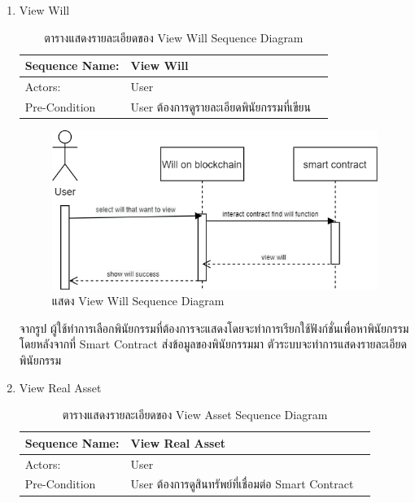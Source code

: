 \documentclass[12pt,oneside,openright,a4paper]{cpe-thai-project}
\begin{document}
\begin{enumerate}[label=\thesubsection.\arabic*,leftmargin=0pt,itemindent=1.25cm]
\clearpage
	\item View Will
	\begin{table}[h]
	\centering
	\caption{ตารางแสดงรายละเอียดของ View Will Sequence Diagram}
\begin{tabularx}{\textwidth}{|l|X|X|} 
		\hline
		Sequence Name: & View Will                                  \\ 
		\hline
		Actors:        & User                                       \\ 
		\hline
		Pre-Condition  & User ต้องการดูรายละเอียดพินัยกรรมที่เขียน  \\
		\hline
	\end{tabularx}
	\end{table}
		\begin{figure}[!thb]
			\centering
			\includegraphics[scale=0.5]{viewWillseq}
			\caption{แสดง View Will Sequence Diagram}
		\end{figure}
		\FloatBarrier
	\tab จากรูป ผู้ใช้ทำการเลือกพินัยกรรมที่ต้องการจะแสดงโดยจะทำการเรียกใช้ฟังก์ชั่นเพื่อหาพินัยกรรมโดยหลังจากที่ Smart Contract ส่งข้อมูลของพินัยกรรมมา ตัวระบบจะทำการแสดงรายละเอียดพินัยกรรม
	\item View Real Asset
	\begin{table}[h]
	\centering
	\caption{ตารางแสดงรายละเอียดของ  View Asset Sequence Diagram}
	\begin{tabularx}{\textwidth}{|l|X|X|} 
		\hline
		Sequence Name: & View Real Asset                                       \\ 
		\hline
		Actors:        & User                                                  \\ 
		\hline
		Pre-Condition  & User ต้องการดูสินทรัพย์ที่เชื่อมต่อ Smart
		  Contract  \\
		\hline
		\end{tabularx}
	\end{table}
		\begin{figure}[!thb]

\end{figure}
\end{enumerate}
\end{document}
